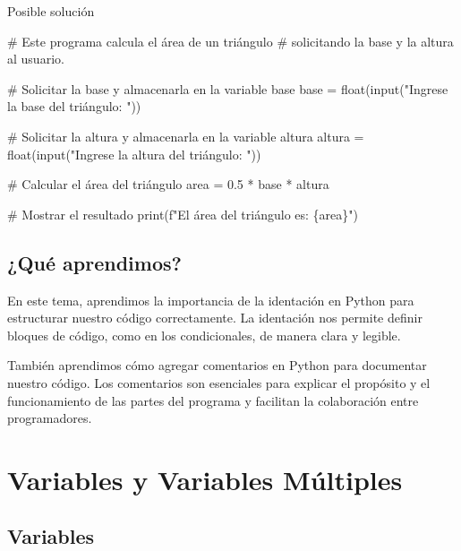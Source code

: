 \documentclass[
  a4paper,
  DIV=11,
  numbers=noendperiod,
  onepage,
  openany]{scrreprt}
\newenvironment{Shaded}{\begin{snugshade}}{\end{snugshade}}
\newcommand{\BuiltInTok}[1]{\textcolor[rgb]{0.00,0.23,0.31}{#1}}
\newcommand{\CommentTok}[1]{\textcolor[rgb]{0.37,0.37,0.37}{#1}}
\newcommand{\FloatTok}[1]{\textcolor[rgb]{0.68,0.00,0.00}{#1}}
\newcommand{\NormalTok}[1]{\textcolor[rgb]{0.00,0.23,0.31}{#1}}
\newcommand{\OperatorTok}[1]{\textcolor[rgb]{0.37,0.37,0.37}{#1}}
\newcommand{\SpecialCharTok}[1]{\textcolor[rgb]{0.37,0.37,0.37}{#1}}
\newcommand{\SpecialStringTok}[1]{\textcolor[rgb]{0.13,0.47,0.30}{#1}}
\newcommand{\StringTok}[1]{\textcolor[rgb]{0.13,0.47,0.30}{#1}}
\begin{document}
Posible solución

\begin{Shaded}
\begin{Highlighting}[]
\CommentTok{\# Este programa calcula el área de un triángulo}
\CommentTok{\# solicitando la base y la altura al usuario.}

\CommentTok{\# Solicitar la base y almacenarla en la variable \textquotesingle{}base\textquotesingle{}}
\NormalTok{base }\OperatorTok{=} \BuiltInTok{float}\NormalTok{(}\BuiltInTok{input}\NormalTok{(}\StringTok{"Ingrese la base del triángulo: "}\NormalTok{))}

\CommentTok{\# Solicitar la altura y almacenarla en la variable \textquotesingle{}altura\textquotesingle{}}
\NormalTok{altura }\OperatorTok{=} \BuiltInTok{float}\NormalTok{(}\BuiltInTok{input}\NormalTok{(}\StringTok{"Ingrese la altura del triángulo: "}\NormalTok{))}

\CommentTok{\# Calcular el área del triángulo}
\NormalTok{area }\OperatorTok{=} \FloatTok{0.5} \OperatorTok{*}\NormalTok{ base }\OperatorTok{*}\NormalTok{ altura}

\CommentTok{\# Mostrar el resultado}
\BuiltInTok{print}\NormalTok{(}\SpecialStringTok{f"El área del triángulo es: }\SpecialCharTok{\{}\NormalTok{area}\SpecialCharTok{\}}\SpecialStringTok{"}\NormalTok{)}
\end{Highlighting}
\end{Shaded}

\section{¿Qué aprendimos?}\label{quuxe9-aprendimos}

En este tema, aprendimos la importancia de la identación en Python para
estructurar nuestro código correctamente. La identación nos permite
definir bloques de código, como en los condicionales, de manera clara y
legible.

También aprendimos cómo agregar comentarios en Python para documentar
nuestro código. Los comentarios son esenciales para explicar el
propósito y el funcionamiento de las partes del programa y facilitan la
colaboración entre programadores.

\chapter{Variables y Variables
Múltiples}\label{variables-y-variables-muxfaltiples}

\section{Variables}\label{variables}
\end{document}
